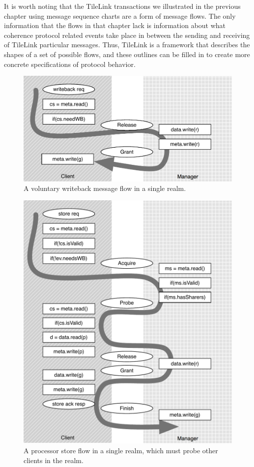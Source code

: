 It is worth noting that the TileLink transactions we illustrated in the previous chapter using message sequence charts
are a form of message flows.
The only information that the flows in that chapter lack is information about what coherence protocol related events take place in between the sending
and receiving of TileLink particular messages.
Thus, TileLink is a framework that describes the shapes of a set of possible flows,
and these outlines can be filled in to create more concrete specifications of protocol behavior.

\begin{figure}
\centering
\includegraphics[width=0.8\columnwidth]{coherence/figures/rel-flow.pdf}
\caption[A volunary writeback flow.]{
A voluntary writeback message flow in a single realm.
}
\label{fig:rel-flow}
\end{figure}

\begin{figure}
\centering
\includegraphics[width=0.8\columnwidth]{coherence/figures/acq-flow.pdf}
\caption[A processor store flow with probes.]{
A processor store flow in a single realm, which must probe other clients in the realm.
}
\label{fig:acq-flow}
\end{figure}

